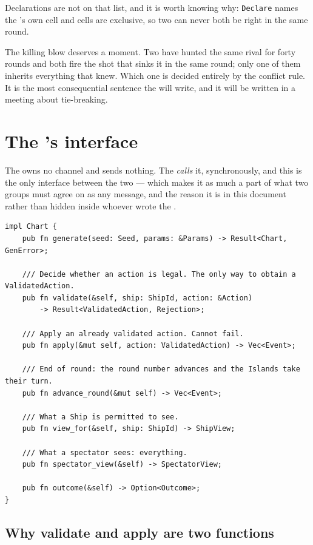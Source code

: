 \documentclass{article}
\begin{document}
Declarations are not on that list, and it is worth knowing why: \texttt{Declare} names the \ship's
own cell and cells are exclusive, so two \ships can never both be right in the same round.

The killing blow deserves a moment. Two \ships have hunted the same rival for forty rounds and both
fire the shot that sinks it in the same round; only one of them inherits everything that \ship{}
knew. Which one is decided entirely by the conflict rule. It is the most consequential sentence the
\WG{} will write, and it will be written in a meeting about tie-breaking.

\newpage
\section{The \chart's interface}
\label{proto:chartapi}

The \chart{} owns no channel and sends nothing. The \admiralty{} \emph{calls} it, synchronously,
and this is the only interface between the two --- which makes it as much a part of what two
groups must agree on as any message, and the reason it is in this document rather than hidden
inside whoever wrote the \chart.

\begin{lstlisting}
impl Chart {
    pub fn generate(seed: Seed, params: &Params) -> Result<Chart, GenError>;

    /// Decide whether an action is legal. The only way to obtain a ValidatedAction.
    pub fn validate(&self, ship: ShipId, action: &Action)
        -> Result<ValidatedAction, Rejection>;

    /// Apply an already validated action. Cannot fail.
    pub fn apply(&mut self, action: ValidatedAction) -> Vec<Event>;

    /// End of round: the round number advances and the Islands take their turn.
    pub fn advance_round(&mut self) -> Vec<Event>;

    /// What a Ship is permitted to see.
    pub fn view_for(&self, ship: ShipId) -> ShipView;

    /// What a spectator sees: everything.
    pub fn spectator_view(&self) -> SpectatorView;

    pub fn outcome(&self) -> Option<Outcome>;
}
\end{lstlisting}

\subsection{Why validate and apply are two functions}
\end{document}
